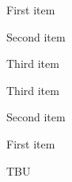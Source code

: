 
\newif\ifshowcontent %
\showcontentfalse




\setcounter{journalSubsectionNumCounter}{4}%
\journalSubsectionNum
  \item First item
  \item Second item
  \item Third item
\subsectionNumEnd

\journalSubsectionNumReverse
  \item Third item
  \item Second item
  \item First item
\subsectionNumEnd


TBU
%
%
